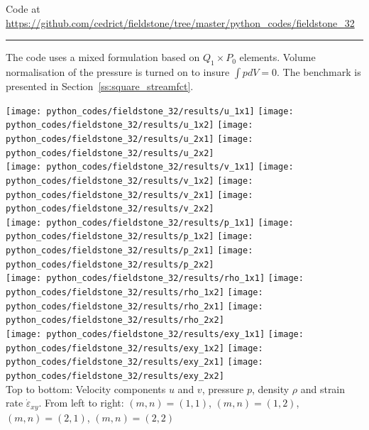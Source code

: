 

\begin{center}
Code at \url{https://github.com/cedrict/fieldstone/tree/master/python_codes/fieldstone_32}
\end{center}

\par\noindent\rule{\textwidth}{0.4pt}


The code uses a mixed formulation based on $Q_1 \times P_0$ elements.
Volume normalisation of the pressure is turned on to insure $\int p dV = 0$. 
The benchmark is presented in Section~\ref{ss:square_streamfct}.

\begin{center}
\texttt{[image: python\_codes/fieldstone\_32/results/u\_1x1]}
\texttt{[image: python\_codes/fieldstone\_32/results/u\_1x2]}
\texttt{[image: python\_codes/fieldstone\_32/results/u\_2x1]}
\texttt{[image: python\_codes/fieldstone\_32/results/u\_2x2]}\\
\texttt{[image: python\_codes/fieldstone\_32/results/v\_1x1]}
\texttt{[image: python\_codes/fieldstone\_32/results/v\_1x2]}
\texttt{[image: python\_codes/fieldstone\_32/results/v\_2x1]}
\texttt{[image: python\_codes/fieldstone\_32/results/v\_2x2]}\\
\texttt{[image: python\_codes/fieldstone\_32/results/p\_1x1]}
\texttt{[image: python\_codes/fieldstone\_32/results/p\_1x2]}
\texttt{[image: python\_codes/fieldstone\_32/results/p\_2x1]}
\texttt{[image: python\_codes/fieldstone\_32/results/p\_2x2]}\\
\texttt{[image: python\_codes/fieldstone\_32/results/rho\_1x1]}
\texttt{[image: python\_codes/fieldstone\_32/results/rho\_1x2]}
\texttt{[image: python\_codes/fieldstone\_32/results/rho\_2x1]}
\texttt{[image: python\_codes/fieldstone\_32/results/rho\_2x2]}\\
\texttt{[image: python\_codes/fieldstone\_32/results/exy\_1x1]}
\texttt{[image: python\_codes/fieldstone\_32/results/exy\_1x2]}
\texttt{[image: python\_codes/fieldstone\_32/results/exy\_2x1]}
\texttt{[image: python\_codes/fieldstone\_32/results/exy\_2x2]}\\
{\captionfont Top to bottom: Velocity components $u$ and $v$, pressure $p$, density $\rho$ and 
strain rate $\dot \varepsilon_{xy}$. 
From left to right: $(m,n)=(1,1)$, $(m,n)=(1,2)$, $(m,n)=(2,1)$, $(m,n)=(2,2)$ }
\end{center}


